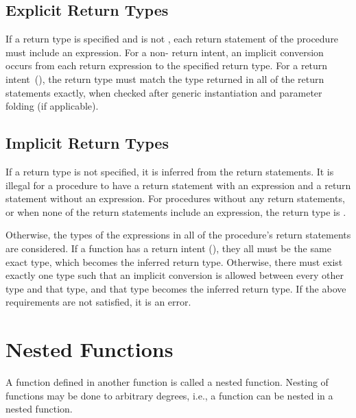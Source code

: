 \subsection{Explicit Return Types}
\label{Explicit_Return_Types}

If a return type is specified and is not ,
each return statement of the procedure must include an expression.
For a non- return intent, an implicit conversion occurs
from each return expression to the specified return type.
For a  return intent~(), the return
type must match the type returned in all of the return statements
exactly, when checked after generic instantiation and parameter folding
(if applicable).

\subsection{Implicit Return Types}
\label{Implicit_Return_Types}

If a return type is not specified, it is inferred from the return statements.
It is illegal for a procedure to have a return statement with an expression
and a return statement without an expression.
For procedures without any return statements, or when none of the
return statements include an expression, the return type is .

Otherwise, the types of the expressions in all of the procedure's
return statements are considered.
If a function has a  return intent (), they
all must be the same exact type, which becomes the inferred return type.
Otherwise, there must exist exactly one type such that an implicit conversion
is allowed between every other type and that type, and that type becomes the
inferred return type.
If the above requirements are not satisfied, it is an error.

\section{Nested Functions}
\label{Nested_Functions}

A function defined in another function is called a nested function.
Nesting of functions may be done to arbitrary degrees, i.e., a
function can be nested in a nested function.

